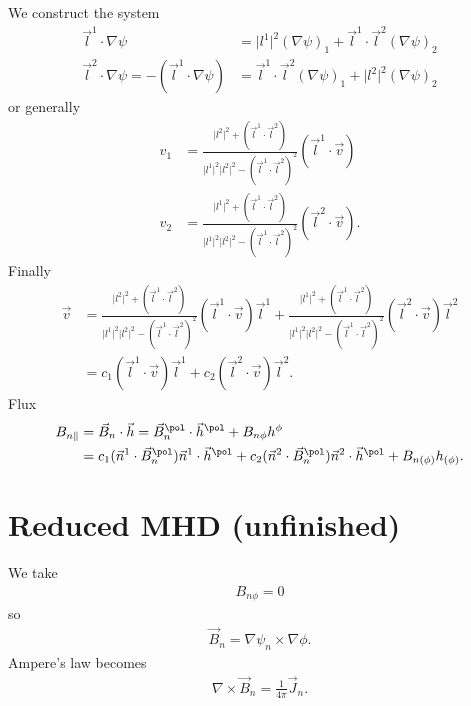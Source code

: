 We construct the system
\begin{align*}
  \vec{l}^{1} \cdot \nabla \psi &= \lvert l^{1} \rvert^{2} (\nabla \psi)_{1} + \vec{l}^{1} \cdot \vec{l}^{2} (\nabla \psi)_{2} \\
  \vec{l}^{2} \cdot \nabla \psi = -(\vec{l}^{1} \cdot \nabla \psi) &= \vec{l}^{1} \cdot \vec{l}^{2} (\nabla \psi)_{1} + \lvert l^{2} \rvert^{2} (\nabla \psi)_{2}
\end{align*}
or generally
\begin{align*}
  v_{1} &= \frac{\lvert l^{2} \rvert^{2} + (\vec{l}^{1} \cdot \vec{l}^{2})}{\lvert l^{1} \rvert^{2} \lvert l^{2} \rvert^{2} - (\vec{l}^{1} \cdot \vec{l}^{2})^{2}} (\vec{l}^{1} \cdot \vec{v}) \\
  v_{2} &= \frac{\lvert l^{1} \rvert^{2} + (\vec{l}^{1} \cdot \vec{l}^{2})}{\lvert l^{1} \rvert^{2} \lvert l^{2} \rvert^{2} - (\vec{l}^{1} \cdot \vec{l}^{2})^{2}} (\vec{l}^{2} \cdot \vec{v}).
\end{align*}
Finally
\begin{align}
  \vec{v} &= \frac{\lvert l^{2} \rvert^{2} + (\vec{l}^{1} \cdot \vec{l}^{2})}{\lvert l^{1} \rvert^{2} \lvert l^{2} \rvert^{2} - (\vec{l}^{1} \cdot \vec{l}^{2})^{2}}(\vec{l}^{1} \cdot \vec{v}) \vec{l}^{1} + \frac{\lvert l^{1} \rvert^{2} + (\vec{l}^{1} \cdot \vec{l}^{2})}{\lvert l^{1} \rvert^{2} \lvert l^{2} \rvert^{2} - (\vec{l}^{1} \cdot \vec{l}^{2})^{2}}(\vec{l}^{2} \cdot \vec{v}) \vec{l}^{2} \\
  &= c_{1} (\vec{l}^{1} \cdot \vec{v}) \vec{l}^{1} + c_{2} (\vec{l}^{2} \cdot \vec{v}) \vec{l}^{2}.
\end{align}
Flux
\begin{align}
  B_{n \parallel} &= \vec{B}_{n} \cdot \vec{h} = \vec{B}_{n}^{\pol} \cdot \vec{h}^{\pol} + B_{n \phi} h^{\phi} \nonumber \\
  &= c_{1} (\vec{n}^{1} \cdot \vec{B}_{n}^{\pol}) \vec{n}^{1} \cdot \vec{h}^{\pol} + c_{2} (\vec{n}^{2} \cdot \vec{B}_{n}^{\pol}) \vec{n}^{2} \cdot \vec{h}^{\pol} + B_{n (\phi)} h_{(\phi)}.
\end{align}

\section{Reduced MHD (unfinished)}

We take
\begin{gather*}
  B_{n \phi} = 0
\end{gather*}
so
\begin{gather*}
  \vec{B}_{n} = \nabla \psi_{n} \times \nabla \phi.
\end{gather*}
Ampere's law becomes
\begin{gather*}
  \nabla \times \vec{B}_{n} = \frac{1}{4 \pi} \vec{J}_{n}.
\end{gather*}

